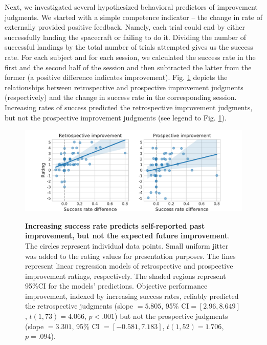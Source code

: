 Next, we investigated several hypothesized behavioral predictors of improvement judgments. We started with a simple competence indicator -- the change in rate of externally provided positive feedback. Namely, each trial could end by either successfully landing the spacecraft or failing to do it. Dividing the number of successful landings by the total number of trials attempted gives us the success rate. For each subject and for each session, we calculated the success rate in the first and the second half of the session and then subtracted the latter from the former (a positive difference indicates improvement). Fig. \ref{fig:5-jolds_and_srd} depicts the relationships between retrospective and prospective improvement judgments (respectively) and the change in success rate in the corresponding session. Increasing rates of success predicted the retrospective improvement judgments, but not the prospective improvement judgments (see legend to Fig. \ref{fig:5-jolds_and_srd}).

\begin{figure}[bth]
    \centering
    {\includegraphics[width=\linewidth]{Figures/c5/jolds_and_srd.pdf}}
    \caption[]{\textbf{Increasing success rate predicts self-reported past improvement, but not the expected future improvement}. The circles represent individual data points. Small uniform jitter was added to the rating values for presentation purposes. The lines represent linear regression models of retrospective and prospective improvement ratings, respectively. The shaded regions represent 95\%\ac{CI} for the models' predictions. Objective performance improvement, indexed by increasing success rates, reliably predicted the retrospective judgments (slope $=5.805$, 95\% \ac{CI}$=[2.96, 8.649]$, $t(1, 73) = 4.066$, $p<.001$) but not the prospective judgments (slope $=3.301$, 95\% \ac{CI} $=[-0.581, 7.183]$, $t(1, 52) = 1.706$, $p=.094$).}\label{fig:5-jolds_and_srd}
\end{figure}

